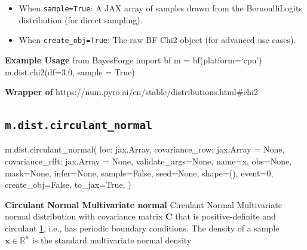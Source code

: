 \documentclass[
  letterpaper,
  DIV=11,
  numbers=noendperiod]{scrartcl}
\newenvironment{Shaded}{\begin{snugshade}}{\end{snugshade}}
\newcommand{\DecValTok}[1]{\textcolor[rgb]{0.68,0.00,0.00}{#1}}
\newcommand{\NormalTok}[1]{\textcolor[rgb]{0.00,0.23,0.31}{#1}}
\newcommand{\OperatorTok}[1]{\textcolor[rgb]{0.37,0.37,0.37}{#1}}
\newcommand{\StringTok}[1]{\textcolor[rgb]{0.13,0.47,0.30}{#1}}
\newcommand{\VariableTok}[1]{\textcolor[rgb]{0.07,0.07,0.07}{#1}}
\begin{document}
\begin{itemize}
\item
  When \texttt{sample=True}: A JAX array of samples drawn from the
  BernoulliLogits distribution (for direct sampling).
\item
  When \texttt{create\_obj=True}: The raw BF Chi2 object (for advanced
  use cases).
\end{itemize}

\textbf{Example Usage} from BayesForge import bf m = bf(platform=`cpu')
m.dist.chi2(df=3.0, sample = True)

\textbf{Wrapper of}
https://num.pyro.ai/en/stable/distributions.html\#chi2

\subsection{\texorpdfstring{\texttt{m.dist.circulant\_normal}}{m.dist.circulant\_normal}}\label{circulant_normal}

\begin{Shaded}
\begin{Highlighting}[]
\NormalTok{m.dist.circulant\_normal(}
\NormalTok{    loc: jax.Array,}
\NormalTok{    covariance\_row: jax.Array }\OperatorTok{=} \VariableTok{None}\NormalTok{,}
\NormalTok{    covariance\_rfft: jax.Array }\OperatorTok{=} \VariableTok{None}\NormalTok{,}
\NormalTok{    validate\_args}\OperatorTok{=}\VariableTok{None}\NormalTok{,}
\NormalTok{    name}\OperatorTok{=}\StringTok{\textquotesingle{}x\textquotesingle{}}\NormalTok{,}
\NormalTok{    obs}\OperatorTok{=}\VariableTok{None}\NormalTok{,}
\NormalTok{    mask}\OperatorTok{=}\VariableTok{None}\NormalTok{,}
\NormalTok{    infer}\OperatorTok{=}\VariableTok{None}\NormalTok{,}
\NormalTok{    sample}\OperatorTok{=}\VariableTok{False}\NormalTok{,}
\NormalTok{    seed}\OperatorTok{=}\VariableTok{None}\NormalTok{,}
\NormalTok{    shape}\OperatorTok{=}\NormalTok{(),}
\NormalTok{    event}\OperatorTok{=}\DecValTok{0}\NormalTok{,}
\NormalTok{    create\_obj}\OperatorTok{=}\VariableTok{False}\NormalTok{,}
\NormalTok{    to\_jax}\OperatorTok{=}\VariableTok{True}\NormalTok{,}
\NormalTok{)}
\end{Highlighting}
\end{Shaded}

\textbf{Circulant Normal Multivariate normal} Circulant Normal
Multivariate normal distribution with covariance matrix \(\mathbf{C}\)
that is positive-definite and circulant
\href{https://en.wikipedia.org/wiki/Matrix_normal_distribution}{1},
i.e., has periodic boundary conditions. The density of a sample
\(\mathbf{x}\in\mathbb{R}^n\) is the standard multivariate normal
density
\end{document}
